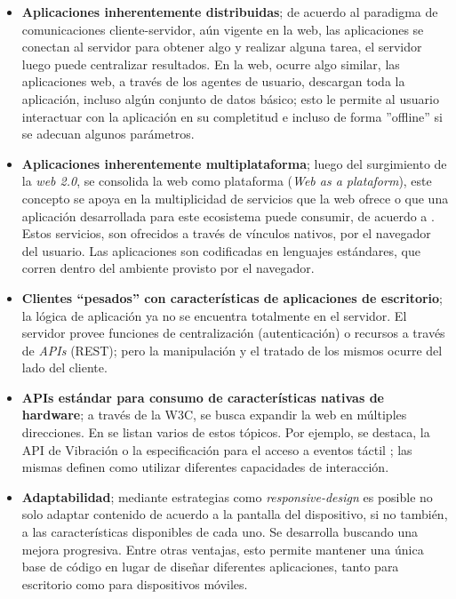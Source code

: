 \begin{itemize}
\item \textbf{Aplicaciones inherentemente distribuidas}; de acuerdo al paradigma de comunicaciones cliente-servidor, aún vigente en la web, las aplicaciones se conectan al servidor para obtener algo y realizar alguna tarea, el servidor luego puede centralizar resultados. En la web, ocurre algo similar, las aplicaciones web, a través de los agentes de usuario, descargan toda la aplicación, incluso algún conjunto de datos básico; esto le permite al usuario interactuar con la aplicación en su completitud e incluso de forma ''offline'' si se adecuan algunos parámetros.

\item \textbf{Aplicaciones inherentemente multiplataforma}; luego del surgimiento de la \emph{web 2.0}, se consolida la web como plataforma (\emph{Web as a plataform}), este concepto se apoya en la multiplicidad de servicios que la web ofrece o que una aplicación desarrollada para este ecosistema puede consumir, de acuerdo a \citet{infra:html5}. Estos servicios, son ofrecidos a través de vínculos nativos, por el navegador del usuario. Las aplicaciones son codificadas en lenguajes estándares, que corren dentro del ambiente provisto por el navegador.

\item \textbf{Clientes ``pesados'' con características de aplicaciones de escritorio}; la lógica de aplicación ya no se encuentra totalmente en el servidor. El servidor provee funciones de centralización (\ie  autenticación) o recursos a través de \emph{APIs} (\ie  REST); pero la manipulación y el tratado de los mismos ocurre del lado del cliente.

\item \textbf{APIs estándar para consumo de características nativas de hardware}; a través de la W3C, se busca expandir la web en múltiples direcciones. En \citep{infra:html5} se listan varios de estos tópicos. Por ejemplo, se destaca, la API de Vibración \citep{infra:vibration} o la especificación para el acceso a eventos táctil \citep{infra:touch}; las mismas definen como utilizar diferentes capacidades de interacción.

\item \textbf{Adaptabilidad}; mediante estrategias como \emph{responsive-design} es posible no solo adaptar contenido de acuerdo a la pantalla del dispositivo, si no también, a las características disponibles de cada uno. Se desarrolla buscando una mejora progresiva. Entre otras ventajas, esto permite mantener una única base de código en lugar de diseñar diferentes aplicaciones, tanto para escritorio como para dispositivos móviles.


\end{itemize}
